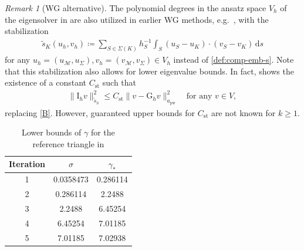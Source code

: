 \documentclass[a4paper]{amsart}
\numberwithin{equation}{section}
\renewcommand{\d}[1]{\,\mathrm{d}#1}
\newcommand{\Mcal}{\mathcal{M}}
\newcommand{\pw}{\mathrm{pw}}
\theoremstyle{remark}
\newtheorem{remark}[theorem]{Remark}
\theoremstyle{definition}
\theoremstyle{assumptionnoperiod}
\begin{document}
\begin{remark}[WG alternative]
	The polynomial degrees in the ansatz space $V_h$ of the eigensolver in  are also utilized in earlier WG methods, e.g.~\cite{MuWangYe2015}, with the stabilization
		\begin{align*}
			\widetilde{s}_K(u_h,v_h) \coloneqq \sum_{S \in \Sigma(K)} h_S^{-1} \int_S (u_S - u_K) \cdot (v_S - v_K) \d{s} 
		\end{align*}
		for any $u_h = (u_\Mcal, u_\Sigma), v_h = (v_\Mcal, v_\Sigma) \in V_h$ instead of \eqref{def:comp-emb-s}. Note that this stabilization also allows for lower eigenvalue bounds. In fact, \cite[Theorem 3.1]{CarstensenZhaiZhang2020} shows the existence of a constant $C_\mathrm{st}$ such that
		\begin{align*}
			\|\mathrm{I}_h v\|_{\widetilde{s}_h}^2 \leq C_\mathrm{st}\|v - \mathrm{G}_h v\|_{a_\pw}^2 \quad\text{for any } v \in V,
		\end{align*}
		replacing \ref{B}. However, guaranteed upper bounds for $C_\mathrm{st}$ are not known for $k \geq 1$.
\end{remark}

\begin{table}
	\centering
	\begin{tabular}{c|c|c}
		Iteration & $\sigma$ & $\gamma_*$\\
		\hline
		1 & 0.0358473 & 0.286114\\
		2 & 0.286114 & 2.2488\\
		3 & 2.2488 & 6.45254\\
		4 & 6.45254 & 7.01185\\
		5 & 7.01185 & 7.02938
	\end{tabular}
	\captionsetup{width=1\linewidth}
	\caption{Lower bounds of $\gamma$ for the reference triangle in }
	\label{tab:leb-comp-emb}
\end{table}
\end{document}

